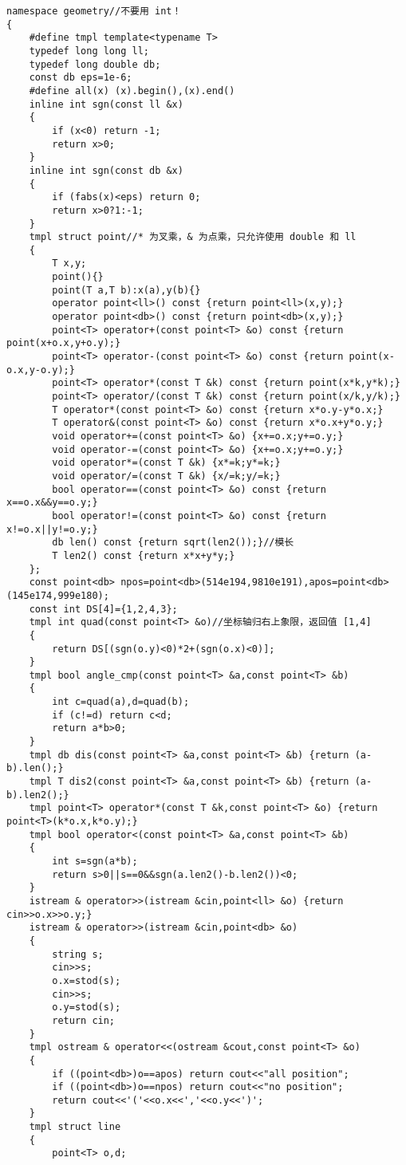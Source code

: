 \documentclass[12pt]{ctexart}
\begin{document}
\begin{lstlisting}
namespace geometry//不要用 int！
{
	#define tmpl template<typename T>
	typedef long long ll;
	typedef long double db;
	const db eps=1e-6;
	#define all(x) (x).begin(),(x).end()
	inline int sgn(const ll &x)
	{
		if (x<0) return -1;
		return x>0;
	}
	inline int sgn(const db &x)
	{
		if (fabs(x)<eps) return 0;
		return x>0?1:-1;
	}
	tmpl struct point//* 为叉乘，& 为点乘，只允许使用 double 和 ll
	{
		T x,y;
		point(){}
		point(T a,T b):x(a),y(b){}
		operator point<ll>() const {return point<ll>(x,y);}
		operator point<db>() const {return point<db>(x,y);}
		point<T> operator+(const point<T> &o) const {return point(x+o.x,y+o.y);}
		point<T> operator-(const point<T> &o) const {return point(x-o.x,y-o.y);}
		point<T> operator*(const T &k) const {return point(x*k,y*k);}
		point<T> operator/(const T &k) const {return point(x/k,y/k);}
		T operator*(const point<T> &o) const {return x*o.y-y*o.x;}
		T operator&(const point<T> &o) const {return x*o.x+y*o.y;}
		void operator+=(const point<T> &o) {x+=o.x;y+=o.y;}
		void operator-=(const point<T> &o) {x+=o.x;y+=o.y;}
		void operator*=(const T &k) {x*=k;y*=k;}
		void operator/=(const T &k) {x/=k;y/=k;}
		bool operator==(const point<T> &o) const {return x==o.x&&y==o.y;}
		bool operator!=(const point<T> &o) const {return x!=o.x||y!=o.y;}
		db len() const {return sqrt(len2());}//模长
		T len2() const {return x*x+y*y;}
	};
	const point<db> npos=point<db>(514e194,9810e191),apos=point<db>(145e174,999e180);
	const int DS[4]={1,2,4,3};
	tmpl int quad(const point<T> &o)//坐标轴归右上象限，返回值 [1,4]
	{
		return DS[(sgn(o.y)<0)*2+(sgn(o.x)<0)];
	}
	tmpl bool angle_cmp(const point<T> &a,const point<T> &b)
	{
		int c=quad(a),d=quad(b);
		if (c!=d) return c<d;
		return a*b>0;
	}
	tmpl db dis(const point<T> &a,const point<T> &b) {return (a-b).len();}
	tmpl T dis2(const point<T> &a,const point<T> &b) {return (a-b).len2();}
	tmpl point<T> operator*(const T &k,const point<T> &o) {return point<T>(k*o.x,k*o.y);}
	tmpl bool operator<(const point<T> &a,const point<T> &b)
	{
		int s=sgn(a*b);
		return s>0||s==0&&sgn(a.len2()-b.len2())<0;
	}
	istream & operator>>(istream &cin,point<ll> &o) {return cin>>o.x>>o.y;}
	istream & operator>>(istream &cin,point<db> &o)
	{
		string s;
		cin>>s;
		o.x=stod(s);
		cin>>s;
		o.y=stod(s);
		return cin;
	}
	tmpl ostream & operator<<(ostream &cout,const point<T> &o) 
	{
		if ((point<db>)o==apos) return cout<<"all position";
		if ((point<db>)o==npos) return cout<<"no position";
		return cout<<'('<<o.x<<','<<o.y<<')';
	}
	tmpl struct line
	{
		point<T> o,d;

\end{lstlisting}
\end{document}
